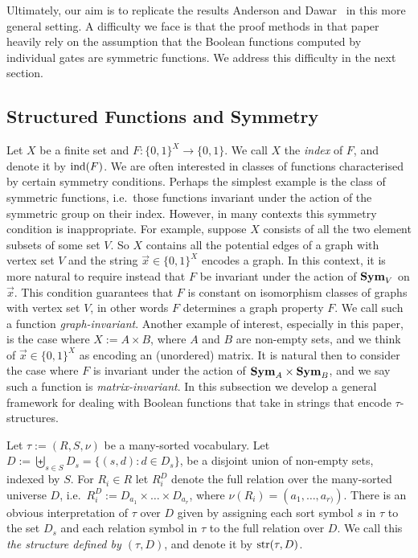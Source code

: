 \documentclass[../main/thesis.tex]{subfiles}
\begin{document}
Ultimately, our aim is to replicate the results Anderson and
Dawar~\cite{AndersonD17} in this more general setting. A difficulty we face is
that the proof methods in that paper heavily rely on the assumption that the
Boolean functions computed by individual gates are symmetric functions. We
address this difficulty in the next section.

\subsection{Structured Functions and Symmetry}
Let $X$ be a finite set and $F: \{0,1\}^{X} \rightarrow \{0,1\}$. We call $X$
the \emph{index} of $F$, and denote it by $\text{\upshape ind}(F)$. We are often interested in
classes of functions characterised by certain symmetry conditions. Perhaps the
simplest example is the class of symmetric functions, i.e.\ those functions
invariant under the action of the symmetric group on their index. However, in
many contexts this symmetry condition is inappropriate. For example, suppose $X$
consists of all the two element subsets of some set $V$. So $X$ contains all the
potential edges of a graph with vertex set $V$ and the string $ \vec{x} \in
\{0,1\}^X$ encodes a graph. In this context, it is more natural to require
instead that $F$ be invariant under the action of $\text{\textbf{Sym}}_V$ on $\vec{x}$. This
condition guarantees that $F$ is constant on isomorphism classes of graphs with
vertex set $V$, in other words $F$ determines a graph property $F$. We call such
a function \emph{graph-invariant}. Another example of interest, especially in
this paper, is the case where $X := A \times B$, where $A$ and $B$ are non-empty
sets, and we think of $\vec{x} \in \{0,1\}^X$ as encoding an (unordered) matrix.
It is natural then to consider the case where $F$ is invariant under the action
of $\text{\textbf{Sym}}_A \times \text{\textbf{Sym}}_B$, and we say such a function is
\emph{matrix-invariant}. In this subsection we develop a general framework for
dealing with Boolean functions that take in strings that encode
$\tau$-structures.

Let $\tau := (R, S, \nu)$ be a many-sorted vocabulary. Let $D := \biguplus_{s
  \in S} D_{s} = \{(s,d) : d \in D_s\}$, be a disjoint union of non-empty sets,
indexed by $S$. For $R_i \in R$ let $R^D_i$ denote the full relation over the
many-sorted universe $D$, i.e.\ $R^D_i := D_{a_1} \times \ldots \times
D_{a_{r}}$, where $\nu(R_i) = (a_1, \ldots , a_{r)})$. There is an obvious
interpretation of $\tau$ over $D$ given by assigning each sort symbol $s$ in
$\tau$ to the set $D_s$ and each relation symbol in $\tau$ to the full relation
over $D$. We call this \emph{the structure defined by $(\tau, D)$}, and denote
it by $\text{str}(\tau, D)$.
\end{document}
